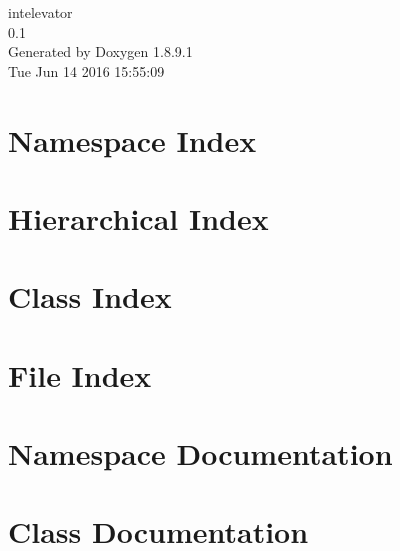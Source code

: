\documentclass[twoside]{book}
\newcommand{\+}{\discretionary{\mbox{\scriptsize$\hookleftarrow$}}{}{}}
\newcommand{\clearemptydoublepage}{%
  \newpage{\pagestyle{empty}\cleardoublepage}%
}
\begin{document}
\begin{titlepage}
\vspace*{7cm}
\begin{center}%
{\Large intelevator \\[1ex]\large 0.\+1 }\\
\vspace*{1cm}
{\large Generated by Doxygen 1.8.9.1}\\
\vspace*{0.5cm}
{\small Tue Jun 14 2016 15:55:09}\\
\end{center}
\end{titlepage}
\clearemptydoublepage
\tableofcontents
\clearemptydoublepage
{}

\chapter{Namespace Index}

\chapter{Hierarchical Index}

\chapter{Class Index}

\chapter{File Index}

\chapter{Namespace Documentation}


\chapter{Class Documentation}



































\end{document}
